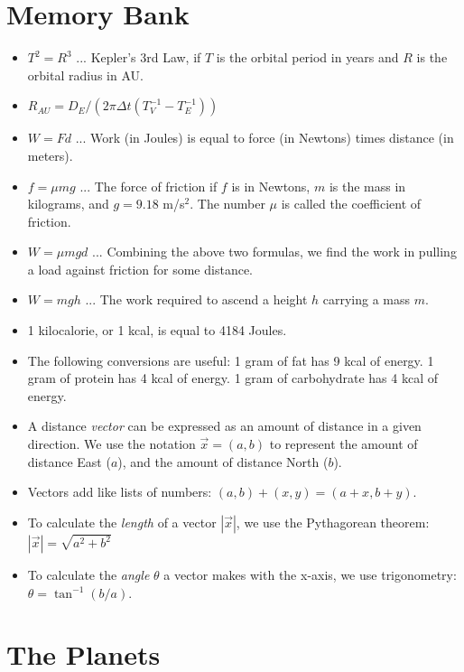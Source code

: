 \documentclass[10pt]{article}
\begin{document}
\maketitle

\section{Memory Bank}

\begin{itemize}
\item $T^2 = R^3$ ... Kepler's 3rd Law, if $T$ is the orbital period in years and $R$ is the orbital radius in AU.
\item $R_{AU} = D_E/\left(2\pi\Delta t (T_V^{-1} - T_E^{-1})\right)$
\item $W = F d$ ... Work (in Joules) is equal to force (in Newtons) times distance (in meters).
\item $f = \mu m g$ ... The force of friction if $f$ is in Newtons, $m$ is the mass in kilograms, and $g = 9.18$ m/s$^2$.  The number $\mu$ is called the coefficient of friction.
\item $W = \mu m g d$ ... Combining the above two formulas, we find the work in pulling a load against friction for some distance.
\item $W = mgh$ ... The work required to ascend a height $h$ carrying a mass $m$.
\item 1 kilocalorie, or 1 kcal, is equal to 4184 Joules.
\item The following conversions are useful: 1 gram of fat has 9 kcal of energy.  1 gram of protein has 4 kcal of energy.  1 gram of carbohydrate has 4 kcal of energy.
\item A distance \textit{vector} can be expressed as an amount of distance in a given direction.  We use the notation $\vec{x} = (a,b)$ to represent the amount of distance East ($a$), and the amount of distance North ($b$).
\item Vectors add like lists of numbers: $(a,b) + (x,y) = (a+x,b+y)$.
\item To calculate the \textit{length} of a vector $|\vec{x}|$, we use the Pythagorean theorem: $|\vec{x}| = \sqrt{a^2+b^2}$
\item To calculate the \textit{angle} $\theta$ a vector makes with the x-axis, we use trigonometry: $\theta = \tan^{-1}(b/a)$.
\end{itemize}

\section{The Planets}
\end{document}
